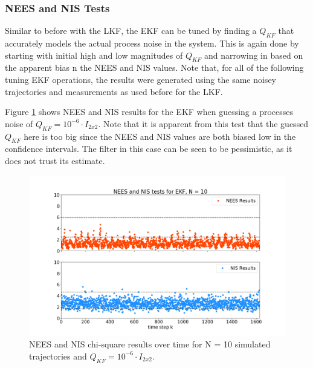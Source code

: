 \documentclass[11pt, a4paper]{article}
\begin{document}
\subsubsection{NEES and NIS Tests}
Similar to before with the LKF, the EKF can be tuned by finding a $Q_{KF}$ that accurately models the actual process noise in the system. 
This is again done by starting with initial high and low magnitudes of $Q_{KF}$ and narrowing in based on the apparent bias n the NEES and NIS values. 
Note that, for all of the following tuning EKF operations, the results were generated using the same noisey trajectories and measurements as used before for the LKF. 

Figure \ref{fig:neesnis_ekf_Qbig} shows NEES and NIS results for the EKF when guessing a processes noise of $Q_{KF} = 10^{-6} \cdot I_{2 x 2}$. 
Note that it is apparent from this test that the guessed $Q_{KF}$ here is too big since the NEES and NIS values are both biased low in the confidence intervals. 
The filter in this case can be seen to be pessimistic, as it does not trust its estimate. 
\begin{figure}[H]
	\centering
	\includegraphics[width=\textwidth]{./Figures/NEESNIS_ekf_N10Q1.0E-06.png}
	\caption{NEES and NIS chi-square results over time for N = 10 simulated trajectories and $Q_{KF} = 10^{-6} \cdot I_{2 x 2}$.}
	\label{fig:neesnis_ekf_Qbig}
\end{figure}
\end{document}
